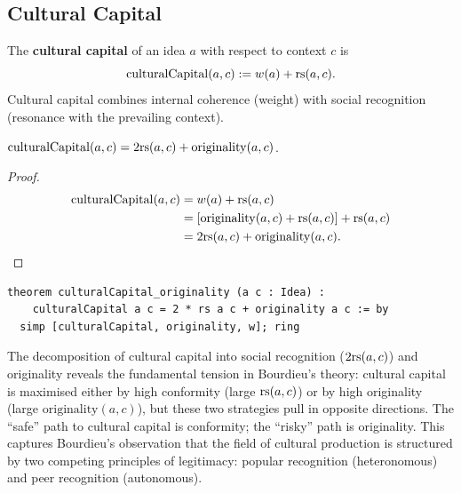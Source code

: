 \subsection{Cultural Capital}

\begin{definition}
\label{def:cultural-capital}
The \textbf{cultural capital} of an idea $a$ with respect to context $c$ is
\[
  \mathrm{culturalCapital}(a, c) := w(a) + \mathrm{rs}(a, c).
\]
Cultural capital combines internal coherence (weight) with social
recognition (resonance with the prevailing context).
\end{definition}

\begin{theorem}
\label{thm:capital-originality}
$\mathrm{culturalCapital}(a, c) = 2\mathrm{rs}(a, c) + \mathrm{originality}(a, c)$.
\end{theorem}

\begin{proof}
\begin{align*}
  \mathrm{culturalCapital}(a, c)
    &= w(a) + \mathrm{rs}(a, c) \\
    &= [\mathrm{originality}(a, c) + \mathrm{rs}(a, c)] + \mathrm{rs}(a, c) \\
    &= 2\mathrm{rs}(a, c) + \mathrm{originality}(a, c).
\end{align*}
\end{proof}

\begin{lstlisting}
theorem culturalCapital_originality (a c : Idea) :
    culturalCapital a c = 2 * rs a c + originality a c := by
  simp [culturalCapital, originality, w]; ring
\end{lstlisting}

\begin{interpretation}
\label{int:capital-bourdieu}
The decomposition of cultural capital into social recognition ($2\mathrm{rs}(a, c)$)
and originality reveals the fundamental tension in Bourdieu's theory:
cultural capital is maximised either by high conformity (large $\mathrm{rs}(a, c)$)
or by high originality (large $\mathrm{originality}(a, c)$), but these
two strategies pull in opposite directions.  The ``safe'' path to cultural
capital is conformity; the ``risky'' path is originality.  This captures
Bourdieu's observation that the field of cultural production is structured
by two competing principles of legitimacy: popular recognition (heteronomous)
and peer recognition (autonomous).
\end{interpretation}

